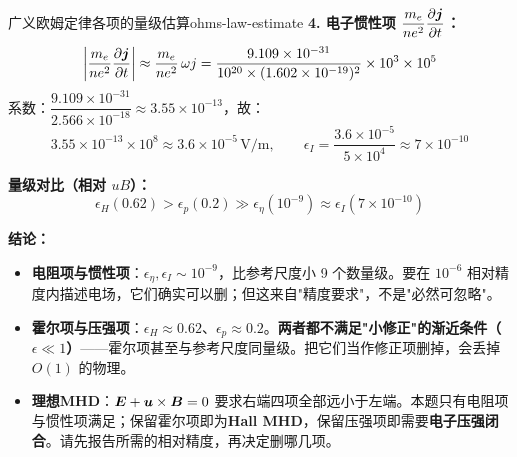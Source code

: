 \begin{example}{广义欧姆定律各项的量级估算}{ohms-law-estimate}
\textbf{4. 电子惯性项 $\dfrac{m_e}{ne^2}\dfrac{\partial\bm{j}}{\partial t}$：}
\[
\left|\frac{m_e}{ne^2}\frac{\partial\bm{j}}{\partial t}\right| \approx \frac{m_e}{ne^2}\,\omega j = \frac{9.109\times 10^{-31}}{10^{20}\times (1.602\times 10^{-19})^2}\times 10^3\times 10^5
\]
系数：$\dfrac{9.109\times 10^{-31}}{2.566\times 10^{-18}} \approx 3.55\times 10^{-13}$，故：
\[
3.55\times 10^{-13}\times 10^8 \approx 3.6\times 10^{-5}\,\mathrm{V/m},
\qquad \epsilon_I = \frac{3.6\times10^{-5}}{5\times10^4} \approx 7\times10^{-10}
\]

\textbf{量级对比（相对 $uB$）：}
\[
\epsilon_H(0.62) > \epsilon_p(0.2) \gg \epsilon_\eta(10^{-9}) \approx \epsilon_I(7\times10^{-10})
\]

\textbf{结论：}
\begin{itemize}[leftmargin=*,itemsep=0pt]
\item \textbf{电阻项与惯性项}：$\epsilon_\eta,\epsilon_I\sim10^{-9}$，比参考尺度小 9 个数量级。要在 $10^{-6}$ 相对精度内描述电场，它们确实可以删；但这来自"精度要求"，不是"必然可忽略"。
\item \textbf{霍尔项与压强项}：$\epsilon_H\approx0.62$、$\epsilon_p\approx0.2$。\textbf{两者都不满足"小修正"的渐近条件（$\epsilon\ll1$）}——霍尔项甚至与参考尺度同量级。把它们当作修正项删掉，会丢掉 $O(1)$ 的物理。
\item \textbf{理想MHD}：$\bm{E}+\bm{u}\times\bm{B}=0$ 要求右端四项全部远小于左端。本题只有电阻项与惯性项满足；保留霍尔项即为\textbf{Hall MHD}，保留压强项即需要\textbf{电子压强闭合}。请先报告所需的相对精度，再决定删哪几项。
\end{itemize}
\end{example}

